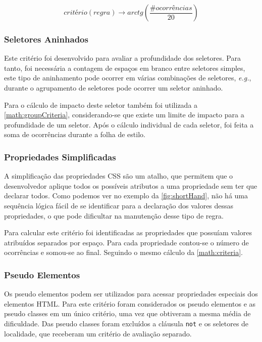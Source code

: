 \begin{equation}
\label{math:groupCriteria}
	critério(regra) \rightarrow arctg\left(\frac{\#ocorrências}{20}\right)	
\end{equation}

\subsubsection{Seletores Aninhados}
Este critério foi desenvolvido para avaliar a profundidade dos seletores. Para tanto, foi necessária a contagem de espaços em branco entre seletores simples, este tipo de aninhamento pode ocorrer em várias combinações de seletores, \textit{e.g.}, durante o agrupamento de seletores pode ocorrer um seletor aninhado.

Para o cálculo de impacto deste seletor também foi utilizada a \autoref{math:groupCriteria}, considerando-se que existe um limite de impacto para a profundidade de um seletor. Após o cálculo individual de cada seletor, foi feita a soma de ocorrências durante a folha de estilo.

\subsubsection{Propriedades Simplificadas}
A simplificação das propriedades CSS são um atalho, que permitem que o desenvolvedor aplique todos os possíveis atributos a uma propriedade sem ter que declarar todos. Como podemos ver no exemplo da \autoref{fig:shortHand}, não há uma sequência lógica fácil de se identificar para a declaração dos valores dessas propriedades, o que pode dificultar na manutenção desse tipo de regra.

Para calcular este critério foi identificadas as propriedades que possuíam valores atribuídos separados por espaço. Para cada propriedade contou-se o número de ocorrências e somou-se ao final. Seguindo o mesmo cálculo da \autoref{math:criteria}.

\subsubsection{Pseudo Elementos}
Os pseudo elementos podem ser utilizados para acessar propriedades especiais dos elementos HTML. Para este critério foram considerados os pseudo elementos e as pseudo classes em um único critério, uma vez que obtiveram a mesma média de dificuldade. Das pseudo classes foram excluídos a cláusula \texttt{not} e os seletores de localidade, que receberam um critério de avaliação separado.


